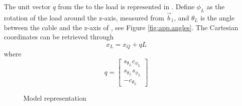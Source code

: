 The unit vector $ q $ from the  to the load is represented in \BF. Define $ \phi_L $ as the rotation of the load around the z-axis, measured from $ \vec{b}_1 $, and $ \theta_L $ is the angle between the cable and the z-axis of \BF, see Figure \ref{fig:app.angles}.
The Cartesian coordinates can be retrieved through
\begin{equation}\label{eq:app.xL2xQ}
x_L = x_Q+qL
\end{equation}
where
\begin{equation}\label{eq:app.q}
q=
\begin{bmatrix}
s_{\theta_L}c_{\phi_L}\\
s_{\theta_L}s_{\phi_L}\\
-c_{\theta_L}
\end{bmatrix}
\end{equation}


\begin{figure}[h!]
	\centering
	\caption{Model representation\label{fig:}}
\end{figure}		

